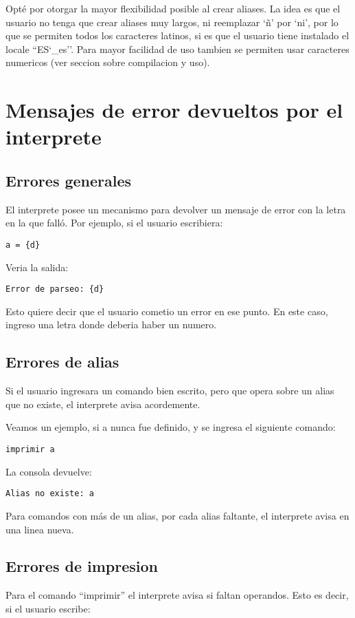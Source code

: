 \documentclass{article}
\begin{document}
	Opté por otorgar la mayor flexibilidad posible al crear aliases. La idea es que el usuario no tenga que crear aliases muy largos, ni reemplazar `ñ' por `ni', por lo que se permiten todos los caracteres latinos, si es que el usuario tiene instalado el locale ``ES\char`_es''. Para mayor facilidad de uso tambien se permiten usar caracteres numericos (ver seccion sobre compilacion y uso).

	\section*{Mensajes de error devueltos por el interprete}
	
	\subsection*{Errores generales}
	El interprete posee un mecanismo para devolver un mensaje de error con la letra en la que falló. Por ejemplo, si el usuario escribiera:
	
	\verb|a = {d}|
	
	\noindent Veria la salida:
	
	\verb|Error de parseo: {d}|
	
	\noindent Esto quiere decir que el usuario cometio un error en ese punto. En este caso, ingreso una letra donde deberia haber un numero.
	
	\subsection*{Errores de alias}
	
	Si el usuario ingresara un comando bien escrito, pero que opera sobre un alias que no existe, el interprete avisa acordemente.
	
	\noindent Veamos un ejemplo, si a nunca fue definido, y se ingresa el siguiente comando:
	
	\verb|imprimir a|
	
	\noindent La consola devuelve:
	
	\verb|Alias no existe: a|
	
	Para comandos con más de un alias, por cada alias faltante, el interprete avisa en una linea nueva.
	
	\subsection*{Errores de impresion}
	
	Para el comando ``imprimir'' el interprete avisa si faltan operandos. Esto es decir, si el usuario escribe:
	
\end{document}
